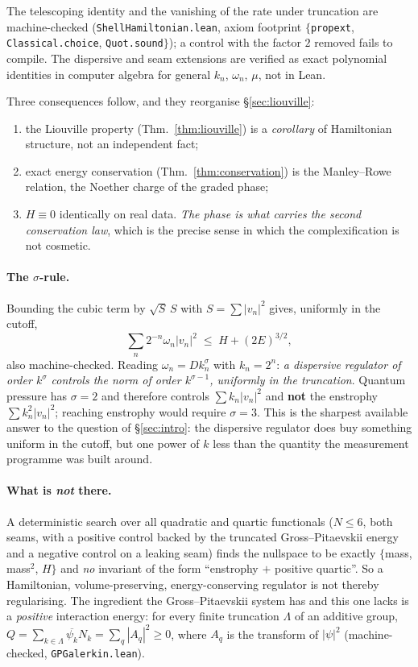 \documentclass[11pt,a4paper]{article}
\theoremstyle{definition}
\theoremstyle{remark}
\newcommand{\conj}[1]{\overline{#1}}
\newcommand{\lean}[1]{\texttt{\small #1}}
\begin{document}
The telescoping identity and the vanishing of the rate under truncation are machine-checked
(\lean{ShellHamiltonian.lean}, axiom footprint $\{$\lean{propext}, \lean{Classical.choice},
\lean{Quot.sound}$\}$); a control with the factor $2$ removed fails to compile. The
dispersive and seam extensions are verified as exact polynomial identities in computer
algebra for general $k_n$, $\omega_n$, $\mu$, not in Lean.

Three consequences follow, and they reorganise \S\ref{sec:liouville}:
\begin{enumerate}\itemsep2pt
\item the Liouville property (Thm.~\ref{thm:liouville}) is a \emph{corollary} of Hamiltonian
      structure, not an independent fact;
\item exact energy conservation (Thm.~\ref{thm:conservation}) is the Manley--Rowe relation,
      the Noether charge of the graded phase;
\item $H \equiv 0$ identically on real data. \emph{The phase is what carries the second
      conservation law}, which is the precise sense in which the complexification is not
      cosmetic.
\end{enumerate}

\paragraph{The $\sigma$-rule.} Bounding the cubic term by $\sqrt{S}\,S$ with
$S = \sum|v_n|^2$ gives, uniformly in the cutoff,
\[
   \textstyle\sum_n 2^{-n}\omega_n |v_n|^2 \;\le\; H + (2E)^{3/2},
\]
also machine-checked. Reading $\omega_n = D k_n^\sigma$ with $k_n = 2^n$: \emph{a dispersive
regulator of order $k^\sigma$ controls the norm of order $k^{\sigma-1}$, uniformly in the
truncation}. Quantum pressure has $\sigma = 2$ and therefore controls $\sum k_n|v_n|^2$ and
\textbf{not} the enstrophy $\sum k_n^2|v_n|^2$; reaching enstrophy would require
$\sigma = 3$. This is the sharpest available answer to the question of \S\ref{sec:intro}:
the dispersive regulator does buy something uniform in the cutoff, but one power of $k$ less
than the quantity the measurement programme was built around.

\paragraph{What is \emph{not} there.} A deterministic search over all quadratic and quartic
functionals ($N \le 6$, both seams, with a positive control backed by the truncated
Gross--Pitaevskii energy and a negative control on a leaking seam) finds the nullspace to be
exactly $\{$mass, mass$^2$, $H\}$ and \emph{no} invariant of the form ``enstrophy $+$
positive quartic''. So a Hamiltonian, volume-preserving, energy-conserving regulator is not
thereby regularising. The ingredient the Gross--Pitaevskii system has and this one lacks is a
\emph{positive} interaction energy: for every finite truncation $\Lambda$ of an additive
group, $Q = \sum_{k\in\Lambda}\conj{\psi_k}N_k = \sum_q|A_q|^2 \ge 0$, where $A_q$ is the
transform of $|\psi|^2$ (machine-checked, \lean{GPGalerkin.lean}).
\end{document}
